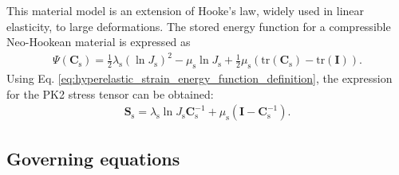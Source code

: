 \documentclass[11pt,english]{article}
\begin{document}
This material model is an extension of Hooke's law, widely used in linear elasticity, to large deformations. The stored energy function for a compressible Neo-Hookean material is expressed as
\begin{align*}
    \Psi (\boldsymbol{C}_{\mathrm{s}}) = \frac{1}{2} \lambda_{\mathrm{s}} (\ln J_{\mathrm{s}})^2 - \mu_{\mathrm{s}} \ln J_{\mathrm{s}} + \frac{1}{2}\mu_{\mathrm{s}}(\mathrm{tr} (\boldsymbol{C}_{\mathrm{s}}) - \mathrm{tr} (\boldsymbol{I})).
\end{align*}
Using Eq. \eqref{eq:hyperelastic_strain_energy_function_definition}, the expression for the PK2 stress tensor can be obtained:
\begin{align*}
    \boldsymbol{S}_{\mathrm{s}} = \lambda_{\mathrm{s}} \ln J_{\mathrm{s}} \boldsymbol{C}_{\mathrm{s}}^{-1}+ \mu_{\mathrm{s}} (\boldsymbol{I} - \boldsymbol{C}_{\mathrm{s}}^{-1}).
\end{align*} 

\subsection{Governing equations}
\end{document}
